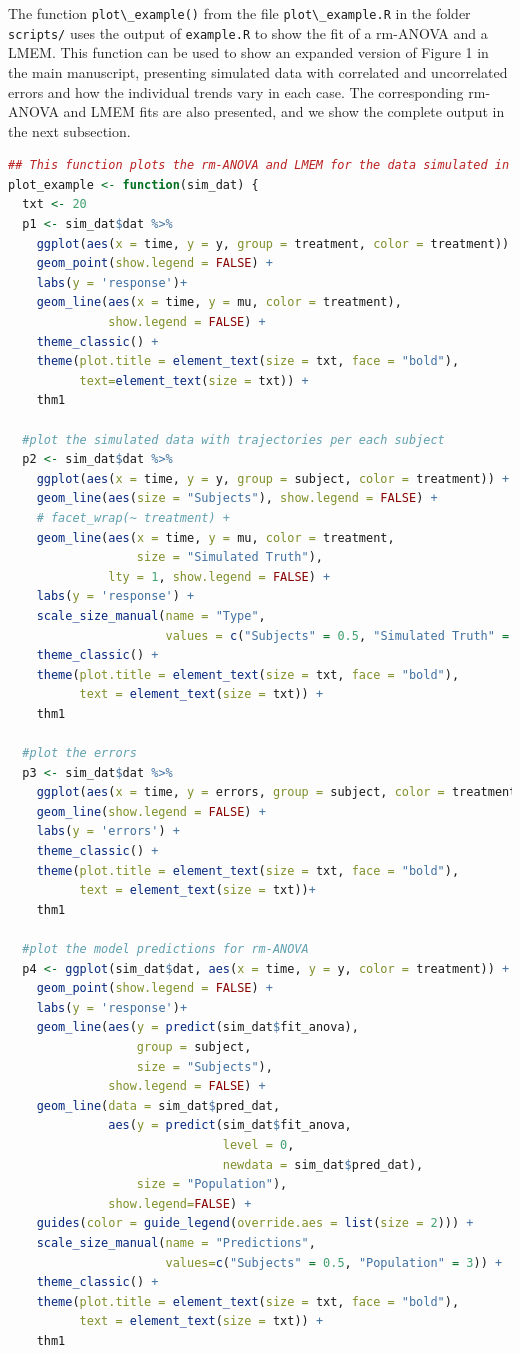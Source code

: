\documentclass[
]{article}
\newcommand{\passthrough}[1]{#1}
\begin{document}
The function \passthrough{\lstinline!plot\_example()!} from the file \passthrough{\lstinline!plot\_example.R!} in the folder \passthrough{\lstinline!scripts/!} uses the output of \passthrough{\lstinline!example.R!} to show the fit of a rm-ANOVA and a LMEM. This function can be used to show an expanded version of Figure 1 in the main manuscript, presenting simulated data with correlated and uncorrelated errors and how the individual trends vary in each case. The corresponding rm-ANOVA and LMEM fits are also presented, and we show the complete output in the next subsection.

\begin{lstlisting}[language=R]
## This function plots the rm-ANOVA and LMEM for the data simulated in example.R
plot_example <- function(sim_dat) {
  txt <- 20
  p1 <- sim_dat$dat %>%
    ggplot(aes(x = time, y = y, group = treatment, color = treatment)) +
    geom_point(show.legend = FALSE) +
    labs(y = 'response')+
    geom_line(aes(x = time, y = mu, color = treatment), 
              show.legend = FALSE) +
    theme_classic() +
    theme(plot.title = element_text(size = txt, face = "bold"),
          text=element_text(size = txt)) +
    thm1
  
  #plot the simulated data with trajectories per each subject
  p2 <- sim_dat$dat %>%
    ggplot(aes(x = time, y = y, group = subject, color = treatment)) +
    geom_line(aes(size = "Subjects"), show.legend = FALSE) +
    # facet_wrap(~ treatment) +
    geom_line(aes(x = time, y = mu, color = treatment, 
                  size = "Simulated Truth"),
              lty = 1, show.legend = FALSE) +
    labs(y = 'response') +
    scale_size_manual(name = "Type", 
                      values = c("Subjects" = 0.5, "Simulated Truth" = 3)) +
    theme_classic() +
    theme(plot.title = element_text(size = txt, face = "bold"),
          text = element_text(size = txt)) +
    thm1
  
  #plot the errors
  p3 <- sim_dat$dat %>%
    ggplot(aes(x = time, y = errors, group = subject, color = treatment)) +
    geom_line(show.legend = FALSE) +
    labs(y = 'errors') +
    theme_classic() +
    theme(plot.title = element_text(size = txt, face = "bold"),
          text = element_text(size = txt))+
    thm1
  
  #plot the model predictions for rm-ANOVA
  p4 <- ggplot(sim_dat$dat, aes(x = time, y = y, color = treatment)) +
    geom_point(show.legend = FALSE) +
    labs(y = 'response')+
    geom_line(aes(y = predict(sim_dat$fit_anova), 
                  group = subject, 
                  size = "Subjects"),
              show.legend = FALSE) +
    geom_line(data = sim_dat$pred_dat,
              aes(y = predict(sim_dat$fit_anova,
                              level = 0,
                              newdata = sim_dat$pred_dat),
                  size = "Population"),
              show.legend=FALSE) +
    guides(color = guide_legend(override.aes = list(size = 2))) +
    scale_size_manual(name = "Predictions",
                      values=c("Subjects" = 0.5, "Population" = 3)) +
    theme_classic() +
    theme(plot.title = element_text(size = txt, face = "bold"),
          text = element_text(size = txt)) +
    thm1
  

\end{lstlisting}
\end{document}
